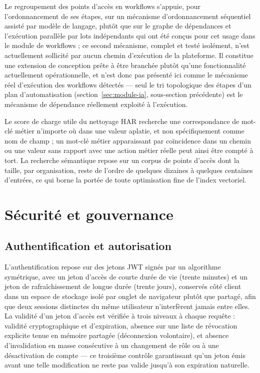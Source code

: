 Le regroupement des points d'accès en workflows s'appuie, pour l'ordonnancement de ses étapes, sur un mécanisme d'ordonnancement séquentiel assisté par modèle de langage, plutôt que sur le graphe de dépendances et l'exécution parallèle par lots indépendants qui ont été conçus pour cet usage dans le module de workflows ; ce second mécanisme, complet et testé isolément, n'est actuellement sollicité par aucun chemin d'exécution de la plateforme. Il constitue une extension de conception prête à être branchée plutôt qu'une fonctionnalité actuellement opérationnelle, et n'est donc pas présenté ici comme le mécanisme réel d'exécution des workflows détectés — seul le tri topologique des étapes d'un plan d'automatisation (section~\ref{sec:module-ia}, sous-section précédente) est le mécanisme de dépendance réellement exploité à l'exécution.

Le score de charge utile du nettoyage HAR recherche une correspondance de mot-clé métier n'importe où dans une valeur aplatie, et non spécifiquement comme nom de champ ; un mot-clé métier apparaissant par coïncidence dans un chemin ou une valeur sans rapport avec une action métier réelle peut ainsi être compté à tort. La recherche sémantique repose sur un corpus de points d'accès dont la taille, par organisation, reste de l'ordre de quelques dizaines à quelques centaines d'entrées, ce qui borne la portée de toute optimisation fine de l'index vectoriel.

\section{Sécurité et gouvernance}
\label{sec:securite-gouvernance}

\subsection{Authentification et autorisation}

L'authentification repose sur des jetons JWT signés par un algorithme symétrique, avec un jeton d'accès de courte durée de vie (trente minutes) et un jeton de rafraîchissement de longue durée (trente jours), conservés côté client dans un espace de stockage isolé par onglet de navigateur plutôt que partagé, afin que deux sessions distinctes du même utilisateur n'interfèrent jamais entre elles. La validité d'un jeton d'accès est vérifiée à trois niveaux à chaque requête : validité cryptographique et d'expiration, absence sur une liste de révocation explicite tenue en mémoire partagée (déconnexion volontaire), et absence d'invalidation en masse consécutive à un changement de rôle ou à une désactivation de compte — ce troisième contrôle garantissant qu'un jeton émis avant une telle modification ne reste pas valide jusqu'à son expiration naturelle.

